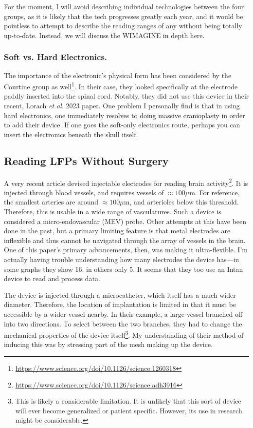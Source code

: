\documentclass[12pt]{report}
\begin{document}
For the moment, I will avoid describing individual technologies between the four groups, as it is likely that the tech progresses greatly each year, and it would be pointless to attempt to describe the reading ranges of any without being totally up-to-date. Instead, we will discuss the WIMAGINE in depth here.

\subsubsection{Soft vs. Hard Electronics.}
The importance of the electronic's physical form has been considered by the Courtine group as well\footnote{\url{https://www.science.org/doi/10.1126/science.1260318}}. In their case, they looked specifically at the electrode paddly inserted into the spinal cord. Notably, they did not use this device in their recent, Lorach \textit{et al}. 2023 paper. One problem I personally find is that in using hard electronics, one immediately resolves to doing massive cranioplasty in order to add their device. If one goes the soft-only electronics route, perhaps you can insert the electronics beneath the skull itself. 

\subsection{Reading LFPs Without Surgery}

A very recent article devised injectable electrodes for reading brain activity\footnote{\url{https://www.science.org/doi/10.1126/science.adh3916}}. It is injected through blood vessels, and requires vessels of $\approx 100 \mu$m. For reference, the smallest arteries are around $\approx 100 \mu$m, and arterioles below this threshold. Therefore, this is usable in a wide range of vasculatures. Such a device is considered a micro-endovascular (MEV) probe. Other attempts at this have been done in the past, but a primary limiting feature is that metal electrodes are inflexible and thus cannot be navigated through the array of vessels in the brain. One of this paper's primary advancements, then, was making it ultra-flexible. I'm actually having trouble understanding how many electrodes the device has---in some graphs they show 16, in others only 5. It seems that they too use an Intan device to read and process data.\newline

The device is injected through a microcatheter, which itself has a much wider diameter. Therefore, the location of implantation is limited in that it must be accessible by a wider vessel nearby. In their example, a large vessel branched off into two directions. To select between the two branches, they had to change the mechanical properties of the device itself\footnote{This is likely a considerable limitation. It is unlikely that this sort of device will ever become generalized or patient specific. However, its use in research might be considerable.}. My understanding of their method of inducing this was by stressing part of the mesh making up the device.\newline
\end{document}
